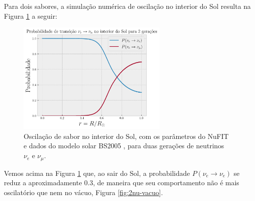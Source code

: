 \documentclass[12pt]{report}
\begin{document}
Para dois sabores, a simulação numérica de oscilação no interior do Sol resulta na Figura \ref{fig:2nu-sol} a seguir:

\begin{figure}[H]
\centering
\includegraphics[width=0.65\textwidth]{fig/2nu-sol.png}
\caption{Oscilação de sabor no interior do Sol, com os parâmetros do NuFIT \cite{nufit} e dados do modelo solar BS2005 \cite{bahcall-model}, para duas gerações de neutrinos $\nu_e$ e $\nu_\mu$.}
\label{fig:2nu-sol}
\end{figure}

Vemos acima na Figura \ref{fig:2nu-sol} que, ao sair do Sol, a probabilidade $P(\nu_e \to \nu_e)$ se reduz a aproximadamente $0.3$, de maneira que seu comportamento não é mais oscilatório que nem no vácuo, Figura \ref{fig:2nu-vacuo}.
\end{document}
